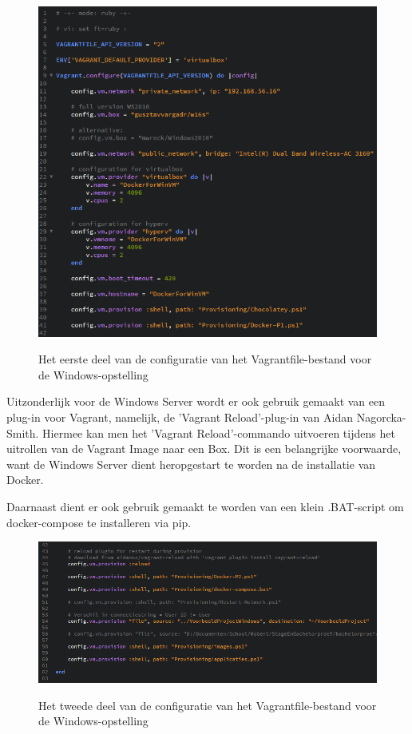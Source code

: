 \begin{figure}
	\centering
	\caption{Het eerste deel van de configuratie van het Vagrantfile-bestand voor de Windows-opstelling}
	\includegraphics[scale=0.75]{img/windowsvagrant01}
	\label{windowsvagrant01}
\end{figure}

Uitzonderlijk voor de Windows Server wordt er ook gebruik gemaakt van een plug-in voor Vagrant, namelijk, de 'Vagrant Reload'-plug-in van Aidan Nagorcka-Smith. Hiermee kan men het 'Vagrant Reload'-commando uitvoeren tijdens het uitrollen van de Vagrant Image naar een Box. Dit is een belangrijke voorwaarde, want de Windows Server dient heropgestart te worden na de installatie van Docker.

Daarnaast dient er ook gebruik gemaakt te worden van een klein .BAT-script om docker-compose te installeren via pip.

\begin{figure}
	\centering
	\caption{Het tweede deel van de configuratie van het Vagrantfile-bestand voor de Windows-opstelling}
	\includegraphics[scale=0.75]{img/windowsvagrant02}
	\label{windowsvagrant02}
\end{figure}

